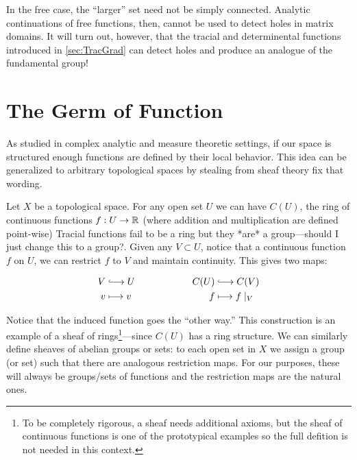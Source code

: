 In the free case, the ``larger'' set need not be simply connected. Analytic
continuations of free functions, then, cannot be used to detect holes in matrix
domains. It will turn out, however, that the tracial and determinental functions
introduced in \cref{sec:TracGrad} can detect holes and produce an analogue of
the fundamental group!

\section{The Germ of Function}%
\label{sec:germs}

As studied in complex analytic and measure theoretic settings, if our space is
structured enough functions are defined by their local behavior. This idea can
be generalized to arbitrary topological spaces by stealing from sheaf theory
{\color{red} fix that wording}.

Let \(X\) be a topological space. For any open set \(U\) we can have \(C(U)\),
the ring of continuous functions \(f: U \to \mathbb{R} \) (where addition and
multiplication are defined point-wise)
{\color{red} Tracial functions fail to be
  a ring but they *are* a group---should I just change this to a group?}.
Given any \(V \subset U\), notice that a continuous function \(f\) on \(U\), we
can restrict \(f\) to \(V\) and maintain continuity. This gives two maps:

\begin{equation*}
\begin{split}
	V &\lhook\joinrel\longrightarrow U \\
  v &\longmapsto v
\end{split} \qquad \qquad \qquad
\begin{split}
	C(U) &\lhook\joinrel\longrightarrow C(V) \\
  f &\longmapsto f \mid _V
\end{split}
\end{equation*}

Notice that the induced function goes the ``other way.'' This construction is an
example of a sheaf of rings\footnote{To be completely rigorous, a sheaf needs
  additional axioms, but the sheaf of continuous functions is one of the
  prototypical examples so the full defition is not needed in this
  context.}---since \(C(U)\) has a ring structure. We can similarly define sheaves
of abelian groups or sets: to each open set in \(X\) we assign a group (or set)
such that there are analogous restriction maps. For our purposes, these will
always be groups/sets of functions and the restriction maps are the natural ones.

